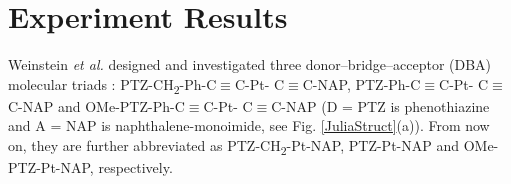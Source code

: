


\section{Experiment Results}

Weinstein {\em et al.} designed and investigated three donor–bridge–acceptor (DBA) molecular triads \cite{delor2014toward,delor2015mechanism,scattergood2014electron}: PTZ-CH\textsubscript{2}-Ph-C$\equiv$C-Pt- C$\equiv$C-NAP, PTZ-Ph-C$\equiv$C-Pt- C$\equiv$C-NAP and OMe-PTZ-Ph-C$\equiv$C-Pt- C$\equiv$C-NAP (D = PTZ is phenothiazine and A = NAP is naphthalene-monoimide, see Fig. \ref{JuliaStruct}(a)). From now on, they are further abbreviated as PTZ-CH\textsubscript{2}-Pt-NAP, PTZ-Pt-NAP and OMe-PTZ-Pt-NAP, respectively.

